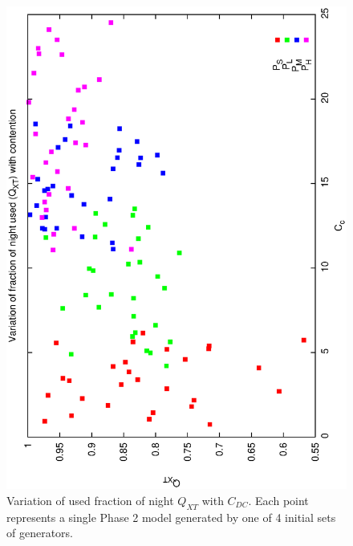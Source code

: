 \begin{figure}[h]

\begin{center}
 \includegraphics[scale=0.5, angle=-90]{figures/p2_gen_qxt.eps}
 \caption[Variation of $Q_{XT}$ with $C_{DC}$ for variable phase2 generator models.] 
   {Variation of used fraction of night $Q_{XT}$ with $C_{DC}$. Each point represents a single Phase 2 model generated by one of 4 initial sets of generators.}
\label{fig:p2_gen_xt}
\end{center} 
\end{figure}

